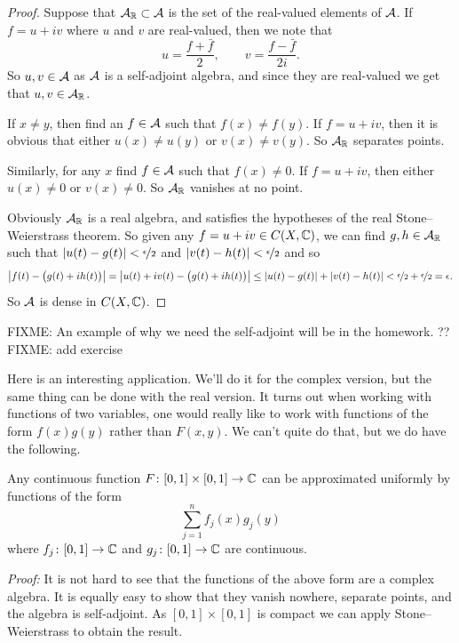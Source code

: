 \begin{proof}
Suppose that ${\mathcal{A}}_{\mathbb{R}} \subset {\mathcal{A}}$ is the set of the real-valued elements of
${\mathcal{A}}$.  If $f = u+iv$ where $u$ and $v$ are real-valued, then we note that
\begin{equation*}
u = \frac{f+\bar{f}}{2}, \qquad
v = \frac{f-\bar{f}}{2i} .
\end{equation*}
So $u, v \in {\mathcal{A}}$ as ${\mathcal{A}}$ is a self-adjoint algebra, and since they are
real-valued we get that $u, v \in {\mathcal{A}}_{\mathbb{R}}$.

If $x \not= y$, then find an $f \in {\mathcal{A}}$ such that $f(x) \not= f(y)$.  If $f
= u+iv$, then it is obvious that either $u(x) \not= u(y)$ or $v(x) \not=
v(y)$.  So ${\mathcal{A}}_{\mathbb{R}}$ separates points.

Similarly, for any $x$ find $f \in {\mathcal{A}}$ such that $f(x) \not= 0$.  If $f
= u+iv$, then either $u(x) \not= 0$ or $v(x) \not= 0$.
So ${\mathcal{A}}_{\mathbb{R}}$ vanishes at no point.

Obviously ${\mathcal{A}}_{\mathbb{R}}$ is a real algebra, and satisfies the hypotheses of the
real Stone--Weierstrass theorem.  So given any $f = u+iv \in C(X,{\mathbb{C}})$,
we can find $g,h \in {\mathcal{A}}_{\mathbb{R}}$ such that
$\lvert {u(t)-g(t)} \rvert < \nicefrac{\epsilon}{2}$ and
$\lvert {v(t)-h(t)} \rvert < \nicefrac{\epsilon}{2}$ and so
\begin{equation*}
\left\lvert {f(t) - \bigl(g(t)+ih(t)\bigr)} \right\rvert = 
\left\lvert {u(t)+iv(t) - \bigl(g(t)+ih(t)\bigr)} \right\rvert \leq
\lvert {u(t)-g(t)} \rvert+\lvert {v(t)-h(t)} \rvert < \nicefrac{\epsilon}{2} +
\nicefrac{\epsilon}{2} = \epsilon.
\end{equation*}
So ${\mathcal{A}}$ is dense in $C(X,{\mathbb{C}})$.
\end{proof}

FIXME: An example of why we need the self-adjoint will be in the homework.
?? FIXME: add exercise

Here is an interesting application.  We'll do it for the complex version, but
the same thing can be done with the real version.  It turns out when working
with functions of two variables, one would really like to work with functions
of the form $f(x)g(y)$ rather than $F(x,y)$.  We can't quite do that, but we
do have the following.

\begin{example}
Any continuous function $F \colon [0,1] \times [0,1] \to {\mathbb{C}}$ can be
approximated uniformly by functions of the form
\begin{equation*}
\sum_{j=1}^n f_j(x) g_j(y)
\end{equation*}
where $f_j \colon [0,1] \to {\mathbb{C}}$ and $g_j \colon [0,1] \to {\mathbb{C}}$ are continuous.

\emph{Proof:}
It is not hard to see that the functions of the above form are a complex
algebra.  It is equally easy to show that they vanish nowhere, separate
points, and the algebra is self-adjoint.  As $[0,1] \times [0,1]$ is compact
we can apply Stone--Weierstrass to obtain the result.
\end{example}

